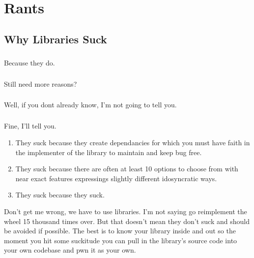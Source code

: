 \documentclass{book}
\begin{document}
\appendix
\chapter{Rants}
\section{Why Libraries Suck}
\label{rant:librariessuck}
\paragraph{}
Because they do.
\paragraph{}
Still need more reasons?
\paragraph{}
Well, if you dont already know, I'm not going to tell you.
\paragraph{}
Fine, I'll tell you.
\begin{enumerate}
    \item They suck because they create dependancies for which you must have faith in the implementer of the library to maintain and keep bug free.
    \item They suck because there are often at least 10 options to choose from with near exact features expressings slightly different idosyncratic ways.
    \item They suck because they suck.
\end{enumerate}
Don't get me wrong, we have to use libraries. I'm not saying go reimplement the wheel 15 thousand times over. But that doesn't mean they don't suck and should be avoided if possible. The best is to know your library inside and out so the moment you hit some suckitude you can pull in the library's source code into your own codebase and \gls{pwn} it as your own.





\end{document}
